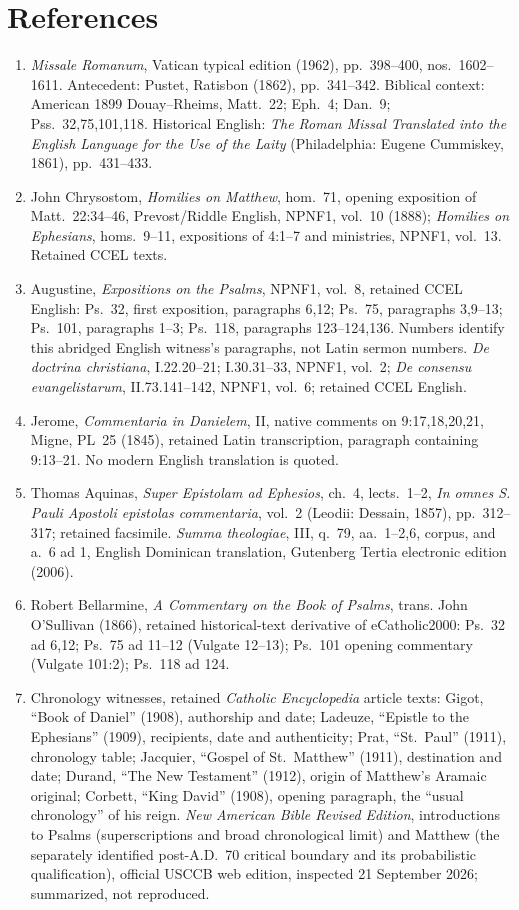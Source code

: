\section*{References}
\begin{enumerate}
\setlength{\itemsep}{0.25em}
\setlength{\parsep}{0pt}
\item \emph{Missale Romanum}, Vatican typical edition (1962), pp.~398--400, nos.~1602--1611. Antecedent: Pustet, Ratisbon (1862), pp.~341--342. Biblical context: American 1899 Douay--Rheims, Matt.~22; Eph.~4; Dan.~9; Pss.~32,75,101,118. Historical English: \emph{The Roman Missal Translated into the English Language for the Use of the Laity} (Philadelphia: Eugene Cummiskey, 1861), pp.~431--433.
\item John Chrysostom, \emph{Homilies on Matthew}, hom.~71, opening exposition of Matt.~22:34--46, Prevost/Riddle English, NPNF1, vol.~10 (1888); \emph{Homilies on Ephesians}, homs.~9--11, expositions of 4:1--7 and ministries, NPNF1, vol.~13. Retained CCEL texts.
\item Augustine, \emph{Expositions on the Psalms}, NPNF1, vol.~8, retained CCEL English: Ps.~32, first exposition, paragraphs 6,12; Ps.~75, paragraphs 3,9--13; Ps.~101, paragraphs 1--3; Ps.~118, paragraphs 123--124,136. Numbers identify this abridged English witness's paragraphs, not Latin sermon numbers. \emph{De doctrina christiana}, I.22.20--21; I.30.31--33, NPNF1, vol.~2; \emph{De consensu evangelistarum}, II.73.141--142, NPNF1, vol.~6; retained CCEL English.
\item Jerome, \emph{Commentaria in Danielem}, II, native comments on 9:17,18,20,21, Migne, PL~25 (1845), retained Latin transcription, paragraph containing 9:13--21. No modern English translation is quoted.
\item Thomas Aquinas, \emph{Super Epistolam ad Ephesios}, ch.~4, lects.~1--2, \emph{In omnes S. Pauli Apostoli epistolas commentaria}, vol.~2 (Leodii: Dessain, 1857), pp.~312--317; retained facsimile. \emph{Summa theologiae}, III, q.~79, aa.~1--2,6, corpus, and a.~6 ad 1, English Dominican translation, Gutenberg Tertia electronic edition (2006).
\item Robert Bellarmine, \emph{A Commentary on the Book of Psalms}, trans. John O'Sullivan (1866), retained historical-text derivative of eCatholic2000: Ps.~32 ad 6,12; Ps.~75 ad 11--12 (Vulgate 12--13); Ps.~101 opening commentary (Vulgate 101:2); Ps.~118 ad 124.
\item Chronology witnesses, retained \emph{Catholic Encyclopedia} article texts: Gigot, ``Book of Daniel'' (1908), authorship and date; Ladeuze, ``Epistle to the Ephesians'' (1909), recipients, date and authenticity; Prat, ``St.~Paul'' (1911), chronology table; Jacquier, ``Gospel of St.~Matthew'' (1911), destination and date; Durand, ``The New Testament'' (1912), origin of Matthew's Aramaic original; Corbett, ``King David'' (1908), opening paragraph, the ``usual chronology'' of his reign. \emph{New American Bible Revised Edition}, introductions to Psalms (superscriptions and broad chronological limit) and Matthew (the separately identified post-A.D.~70 critical boundary and its probabilistic qualification), official USCCB web edition, inspected 21 September 2026; summarized, not reproduced.

\end{enumerate}
